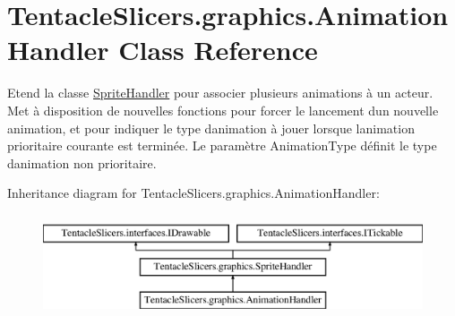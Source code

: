 \hypertarget{class_tentacle_slicers_1_1graphics_1_1_animation_handler}{}\section{Tentacle\+Slicers.\+graphics.\+Animation\+Handler Class Reference}
\label{class_tentacle_slicers_1_1graphics_1_1_animation_handler}


Etend la classe \hyperlink{class_tentacle_slicers_1_1graphics_1_1_sprite_handler}{Sprite\+Handler} pour associer plusieurs animations à un acteur. Met à disposition de nouvelles fonctions pour forcer le lancement d\textquotesingle{}un nouvelle animation, et pour indiquer le type d\textquotesingle{}animation à jouer lorsque l\textquotesingle{}animation prioritaire courante est terminée. Le paramètre Animation\+Type définit le type d\textquotesingle{}animation non prioritaire.  


Inheritance diagram for Tentacle\+Slicers.\+graphics.\+Animation\+Handler\+:\begin{figure}[H]
\begin{center}
\leavevmode
\includegraphics[height=3.000000cm]{class_tentacle_slicers_1_1graphics_1_1_animation_handler}
\end{center}
\end{figure}
